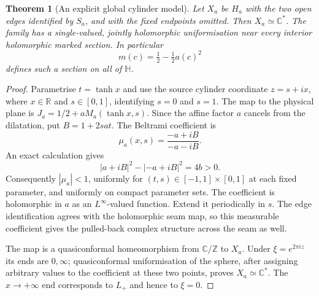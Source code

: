 \documentclass[11pt]{article}
\newtheorem{theorem}{Theorem}
\newcommand{\C}{\mathbb C}
\newcommand{\HH}{\mathbb H}
\begin{document}
\begin{theorem}[An explicit global cylinder model]\label{thm:qc}
Let $X_a$ be $H_a$ with the two open edges identified by $S_a$, and with the
fixed endpoints omitted. Then $X_a\simeq\C^*$.
The family has a single-valued, jointly holomorphic uniformisation near
every interior holomorphic marked section. In particular
\[
 m(c)=\tfrac12-\tfrac12 a(c)^2
\]
defines such a section on all of $\HH$.
\end{theorem}
\begin{proof}
Parametrise $t=\tanh x$ and use the source cylinder coordinate $z=s+ix$,
where $x\in\mathbb R$ and $s\in[0,1]$, identifying $s=0$ and $s=1$.
The map to the physical plane is $J_a=1/2+aM_a(\tanh x,s)$.
Since the affine factor $a$ cancels from the dilatation, put $B=1+2sat$.
The Beltrami coefficient is
\[
 \mu_a(x,s)=\frac{-a+iB}{-a-iB}.
\]
An exact calculation gives
\[
 |a+iB|^2-|-a+iB|^2=4b>0.
\]
Consequently $|\mu_a|<1$, uniformly for $(t,s)\in[-1,1]\times[0,1]$
at each fixed parameter, and uniformly on compact parameter sets. The
coefficient is holomorphic in $a$ as an $L^\infty$-valued function.
Extend it periodically in $s$. The edge identification agrees with the
holomorphic seam map, so this measurable coefficient gives the pulled-back
complex structure across the seam as well.

The map is a quasiconformal homeomorphism from $\C/\mathbb Z$ to $X_a$.
Under $\xi=e^{2\pi iz}$ its ends are $0,\infty$; quasiconformal
uniformisation of the sphere, after assigning arbitrary values to the
coefficient at these two points, proves $X_a\simeq\C^*$.
The $x\to+\infty$ end corresponds to $L_+$ and hence to $\xi=0$.


\end{proof}
\end{document}
